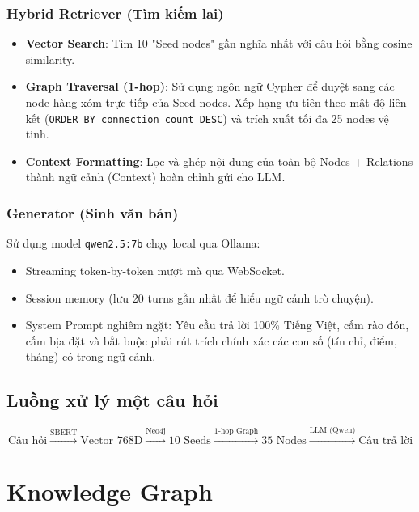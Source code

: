 \documentclass[12pt,a4paper]{article}
\begin{document}
\subsubsection{Hybrid Retriever (Tìm kiếm lai)}
\begin{itemize}
\item \textbf{Vector Search}: Tìm 10 "Seed nodes" gần nghĩa nhất với câu hỏi bằng cosine similarity.
\item \textbf{Graph Traversal (1-hop)}: Sử dụng ngôn ngữ Cypher để duyệt sang các node hàng xóm trực tiếp của Seed nodes. Xếp hạng ưu tiên theo mật độ liên kết (\texttt{ORDER BY connection\_count DESC}) và trích xuất tối đa 25 nodes vệ tinh.
\item \textbf{Context Formatting}: Lọc và ghép nội dung của toàn bộ Nodes + Relations thành ngữ cảnh (Context) hoàn chỉnh gửi cho LLM.
\end{itemize}

\subsubsection{Generator (Sinh văn bản)}
Sử dụng model \texttt{qwen2.5:7b} chạy local qua Ollama:
\begin{itemize}
\item Streaming token-by-token mượt mà qua WebSocket.
\item Session memory (lưu 20 turns gần nhất để hiểu ngữ cảnh trò chuyện).
\item System Prompt nghiêm ngặt: Yêu cầu trả lời 100\% Tiếng Việt, cấm rào đón, cấm bịa đặt và bắt buộc phải rút trích chính xác các con số (tín chỉ, điểm, tháng) có trong ngữ cảnh.
\end{itemize}

\subsection{Luồng xử lý một câu hỏi}
\[
\text{Câu hỏi} \xrightarrow{\text{SBERT}} \text{Vector 768D} \xrightarrow{\text{Neo4j}} \text{10 Seeds}
\xrightarrow{\text{1-hop Graph}} \text{35 Nodes} \xrightarrow{\text{LLM (Qwen)}} \text{Câu trả lời}
\]

\section{Knowledge Graph}
\end{document}
